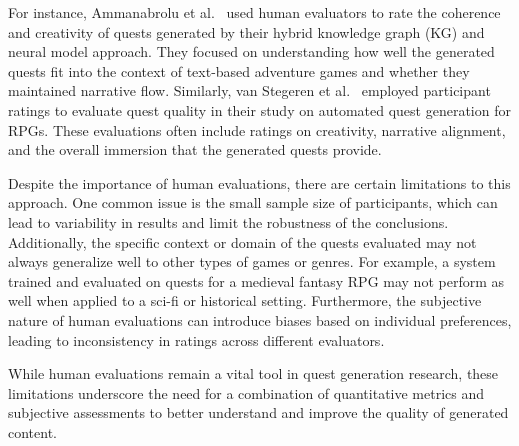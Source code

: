 For instance, Ammanabrolu et al.~\cite{ammanabrolu2019toward} used human evaluators to rate the coherence
and creativity of quests generated by their hybrid knowledge graph (KG) and neural
model approach. They focused on understanding how well the generated quests fit into
the context of text-based adventure games and whether they maintained narrative flow.
Similarly, van Stegeren et al.~\cite{van2021fine} employed participant ratings to evaluate quest quality
in their study on automated quest generation for RPGs. These evaluations often include
ratings on creativity, narrative alignment, and the overall immersion that the generated
quests provide.

Despite the importance of human evaluations, there are certain limitations to this
approach. One common issue is the small sample size of participants, which can lead to
variability in results and limit the robustness of the conclusions. Additionally, the specific
context or domain of the quests evaluated may not always generalize well to other types
of games or genres. For example, a system trained and evaluated on quests for a medieval
fantasy RPG may not perform as well when applied to a sci-fi or historical setting.
Furthermore, the subjective nature of human evaluations can introduce biases based on
individual preferences, leading to inconsistency in ratings across different evaluators.

While human evaluations remain a vital tool in quest generation research, these limitations
underscore the need for a combination of quantitative metrics and subjective
assessments to better understand and improve the quality of generated content.

\newpage
